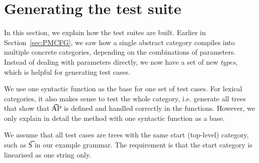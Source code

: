 



\section{Generating the test suite}
\label{sec:testing}

In this section, we explain how the test suites are built.
Earlier in Section~\ref{sec:PMCFG}, we saw how a single abstract category
compiles into multiple concrete categories, depending on the
combinations of parameters. Instead of dealing with parameters
directly, we now have a set of new \emph{types}, which is helpful for
generating test cases.

We use one syntactic function as the base for one set of test
cases. For lexical categories, it also makes sense to test the whole
category, i.e. generate all trees that show that \t{AP} is defined and
handled correctly in the functions. However, we only explain in detail
the method with one syntactic function as a base.

We assume that all test cases are trees with the same start
(top-level) category, such as \t{S} in our example grammar. The
requirement is that the start category is linearised as one string only. 

